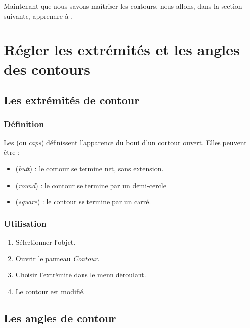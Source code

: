 Maintenant que nous savons maîtriser les contours, nous allons, dans la section suivante, apprendre à .

\section{Régler les extrémités et les angles des contours}

\subsection{Les extrémités de contour}

\subsubsection{Définition}

Les  (ou \emph{caps}) définissent l'apparence du bout d'un contour ouvert. Elles peuvent être :

\begin{itemize}
    \item {} (\emph{butt}) : le contour se termine net, sans extension.
    \item {} (\emph{round}) : le contour se termine par un demi-cercle.
    \item {} (\emph{square}) : le contour se termine par un carré.
\end{itemize}

\subsubsection{Utilisation}

\begin{enumerate}
    \item Sélectionner l'objet.
    \item Ouvrir le panneau \emph{Contour}.
    \item Choisir l'extrémité dans le menu déroulant.
    \item Le contour est modifié.
\end{enumerate}

\subsection{Les angles de contour}

